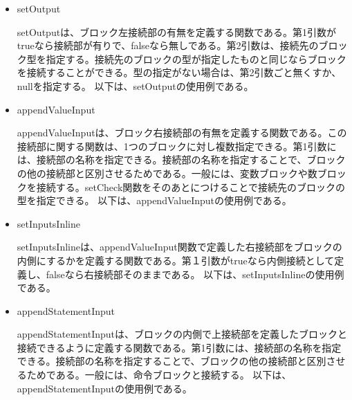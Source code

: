 \documentclass{risepaper}
\begin{document}
\begin{itemize}
\item setOutput

setOutputは、ブロック左接続部の有無を定義する関数である。第1引数がtrueなら接続部が有りで、falseなら無しである。第2引数は、接続先のブロック型を指定する。接続先のブロックの型が指定したものと同じならブロックを接続することができる。型の指定がない場合は、第2引数ごと無くすか、nullを指定する。
以下は、setOutputの使用例である。


\item appendValueInput

appendValueInputは、ブロック右接続部の有無を定義する関数である。この接続部に関する関数は、1つのブロックに対し複数指定できる。第1引数には、接続部の名称を指定できる。接続部の名称を指定することで、ブロックの他の接続部と区別させるためである。一般には、変数ブロックや数ブロックを接続する。setCheck関数をそのあとにつけることで接続先のブロックの型を指定できる。
以下は、appendValueInputの使用例である。


\item setInputsInline

setInputsInlineは、appendValueInput関数で定義した右接続部をブロックの内側にするかを定義する関数である。第１引数がtrueなら内側接続として定義し、falseなら右接続部そのままである。
以下は、setInputsInlineの使用例である。


\item appendStatementInput

appendStatementInputは、ブロックの内側で上接続部を定義したブロックと接続できるように定義する関数である。第1引数には、接続部の名称を指定できる。接続部の名称を指定することで、ブロックの他の接続部と区別させるためである。一般には、命令ブロックと接続する。
以下は、appendStatementInputの使用例である。


\end{itemize}
\end{document}
